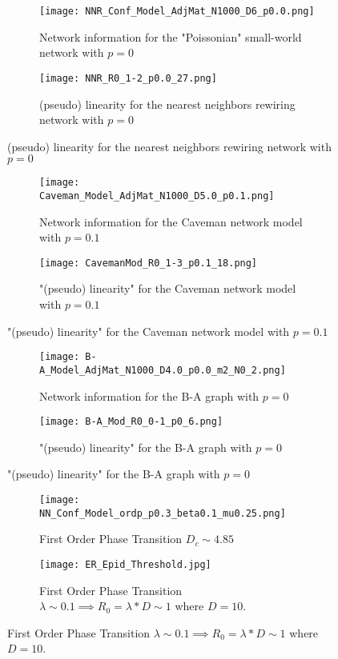 \documentclass[11pt, a4paper, twoside]{article}
\begin{document}
	\newpage
	\begin{figure}[ht]
		\begin{subfigure}{0.45\textwidth}
			\texttt{[image: NNR\_Conf\_Model\_AdjMat\_N1000\_D6\_p0.0.png]}
			\centering
			\caption{Network information for the "Poissonian" small-world network with $p = 0$}
			\label{fig::adjmat_NNR_Conf_Model}
		\end{subfigure}
		\hfill
		\begin{subfigure}{0.45\textwidth}
			\texttt{[image: NNR\_R0\_1-2\_p0.0\_27.png]}
			\caption{(pseudo) linearity for the nearest neighbors rewiring network with $p = 0$}
			\label{fig::NNR_Conf_Model}
		\end{subfigure}
	\end{figure}
	\begin{figure}[b]
		\begin{subfigure}{0.45\textwidth}
			\texttt{[image: Caveman\_Model\_AdjMat\_N1000\_D5.0\_p0.1.png]}
			\centering
			\caption{Network information for the Caveman network model with $p = 0.1$}
			\label{fig::adjmat_Caveman_Model}
		\end{subfigure}
		\hfill
		\begin{subfigure}{0.45\textwidth}
			\texttt{[image: CavemanMod\_R0\_1-3\_p0.1\_18.png]}
			\caption{"(pseudo) linearity" for the Caveman network model with $p = 0.1$}
			\label{fig::Caveman_Model}
		\end{subfigure}
	\end{figure}
	\begin{figure}[t]
		\begin{subfigure}{0.45\textwidth}
			\texttt{[image: B-A\_Model\_AdjMat\_N1000\_D4.0\_p0.0\_m2\_N0\_2.png]}
			\centering
			\caption{Network information for the B-A graph with $p = 0$}
			\label{fig::adjmat_B-A_Model}
		\end{subfigure}
		\hfill
		\begin{subfigure}{0.45\textwidth}
			\texttt{[image: B-A\_Mod\_R0\_0-1\_p0\_6.png]}
			\caption{"(pseudo) linearity" for the B-A graph with $p = 0$}
			\label{fig::Barabasi_AlbertSIR}
		\end{subfigure}
	\end{figure}


\begin{figure}[ht]
	\begin{subfigure}{0.5\textwidth}
		\texttt{[image: NN\_Conf\_Model\_ordp\_p0.3\_beta0.1\_mu0.25.png]}
		\centering
		\caption{First Order Phase Transition $D_c \sim 4.85$}
		\label{fig:PhaseTransition}
	\end{subfigure}
	\hfill
	\begin{subfigure}{0.5\textwidth}
		\texttt{[image: ER\_Epid\_Threshold.jpg]}
		\centering
		\caption{First Order Phase Transition $\lambda \sim 0.1 \implies R_0 = \lambda * D \sim 1$ where $D = 10$.}
		\label{fig:ER_Epid_Threshold}
	\end{subfigure}
\end{figure}


\clearpage


\end{document}
